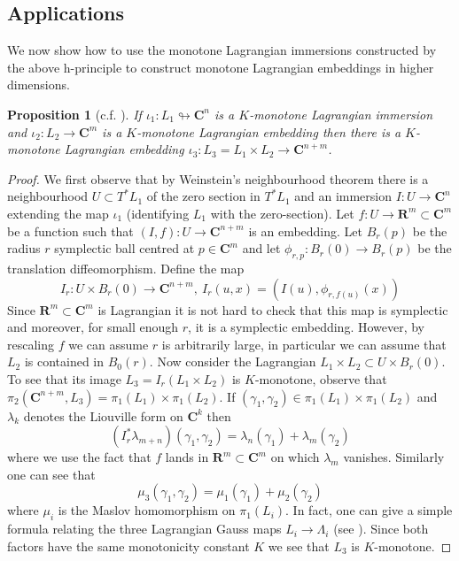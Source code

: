 \documentclass{amsart}
\newcommand{\CC}{\mathbf{C}}
\newcommand{\RR}{\mathbf{R}}
\newtheorem{prp}[thm]{Proposition}
\begin{document}
\subsection{Applications}\label{h-prin-appl}
We now show how to use the monotone Lagrangian immersions constructed by the above h-principle to construct monotone Lagrangian embeddings in higher dimensions.
\begin{prp}[c.f. {\cite[Proposition 1.2.3]{ALP}}]\label{ALP}
If $\iota_1\colon L_1\looparrowright\CC^n$ is a $K$-monotone Lagrangian immersion and $\iota_2\colon L_2\rightarrow\CC^m$ is a $K$-monotone Lagrangian embedding then there is a $K$-monotone Lagrangian embedding $\iota_3\colon L_3=L_1\times L_2\to\CC^{n+m}$.
\end{prp}
\begin{proof}
We first observe that by Weinstein's neighbourhood theorem there is a neighbourhood $U\subset T^*L_1$ of the zero section in $T^*L_1$ and an immersion $I\colon U\to\CC^n$ extending the map $\iota_1$ (identifying $L_1$ with the zero-section). Let $f\colon U\to\RR^m\subset\CC^m$ be a function such that $(I,f)\colon U\to\CC^{n+m}$ is an embedding. Let $B_r(p)$ be the radius $r$ symplectic ball centred at $p\in\CC^m$ and let $\phi_{r,p}:B_r(0)\rightarrow B_r(p)$ be the translation diffeomorphism. Define the map
\[I_r\colon U\times B_r(0)\to\CC^{n+m},\ I_r(u,x)=(I(u),\phi_{r,f(u)}(x))\]
Since $\RR^m\subset\CC^m$ is Lagrangian it is not hard to check that this map is symplectic and moreover, for small enough $r$, it is a symplectic embedding. However, by rescaling $f$ we can assume $r$ is arbitrarily large, in particular we can assume that $L_2$ is contained in $B_0(r)$. Now consider the Lagrangian $L_1\times L_2\subset U\times B_r(0)$. To see that its image $L_3=I_r(L_1\times L_2)$ is $K$-monotone, observe that $\pi_2(\CC^{n+m},L_3)=\pi_1(L_1)\times\pi_1(L_2)$. If $(\gamma_1,\gamma_2)\in\pi_1(L_1)\times\pi_1(L_2)$ and $\lambda_k$ denotes the Liouville form on $\CC^k$ then
\[(I_r^*\lambda_{m+n})(\gamma_1,\gamma_2)=\lambda_n(\gamma_1)+\lambda_m(\gamma_2)\]
where we use the fact that $f$ lands in $\RR^m\subset\CC^m$ on which $\lambda_m$ vanishes. Similarly one can see that
\[\mu_3(\gamma_1,\gamma_2)=\mu_1(\gamma_1)+\mu_2(\gamma_2)\]
where $\mu_i$ is the Maslov homomorphism on $\pi_1(L_i)$. In fact, one can give a simple formula relating the three Lagrangian Gauss maps $L_i\to\Lambda_i$ (see {\cite[Theorem 2.6]{Fuk}}). Since both factors have the same monotonicity constant $K$ we see that $L_3$ is $K$-monotone.
\end{proof}
\end{document}
